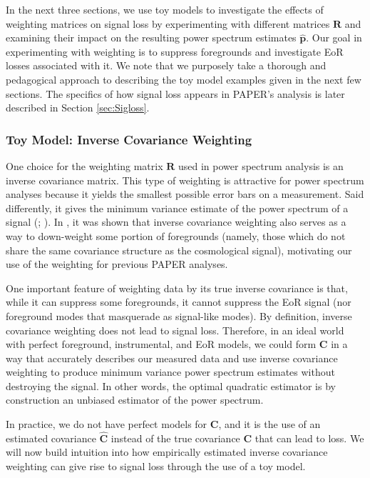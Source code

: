 \documentclass[preprint2,numberedappendix,tighten]{aastex6}  %
\begin{document}
In the next three sections, we use toy models to investigate the effects of weighting matrices on signal loss by experimenting with different matrices $\textbf{R}$ and examining their impact on the resulting power spectrum estimates $\widehat{\textbf{p}}$. Our goal in 
experimenting with weighting is to suppress foregrounds and investigate EoR losses associated with it. We note that we 
purposely take a thorough and pedagogical approach to describing the toy model examples given in the next few sections. The specifics of how signal loss appears in PAPER's analysis is later described in Section 
\ref{sec:Sigloss}.

\subsubsection{Toy Model: Inverse Covariance Weighting}
\label{sec:toymodel}

One choice for the weighting matrix $\textbf{R}$ used in power spectrum analysis is an inverse covariance matrix. This type of weighting is attractive for power spectrum analyses because it yields the smallest possible error bars on a measurement. Said differently, it gives the minimum variance estimate of the power spectrum of a signal (\citealt{tegmark_et_al1997a}; \citealt{bond_et_al1998}). In \citet{liu_tegmark2011}, it was shown that inverse covariance weighting also serves as a way to down-weight some portion of foregrounds (namely, those which do not share the same covariance structure as the cosmological signal), motivating our use of the weighting for previous PAPER analyses.

One important feature of weighting data by its true inverse covariance is that, while it can suppress some foregrounds, it cannot suppress the EoR signal (nor foreground modes that masquerade as signal-like modes). By definition, inverse covariance weighting does not lead to signal loss. Therefore, in an ideal world with perfect foreground, 
instrumental, and EoR models, we could form $\textbf{C}$ in a way that accurately describes our measured data and use inverse covariance weighting to produce minimum variance power spectrum estimates without destroying the signal. In other words, the optimal quadratic estimator is by construction an unbiased estimator of the power spectrum.

In practice, we do not have perfect models for $\textbf{C}$, and it is the use of an estimated covariance $\widehat{\textbf{C}}$ instead of the true covariance $\textbf{C}$ that can lead to loss. We will now build intuition into how empirically estimated inverse covariance weighting can give rise to signal loss through the use of a toy model.
\end{document}
